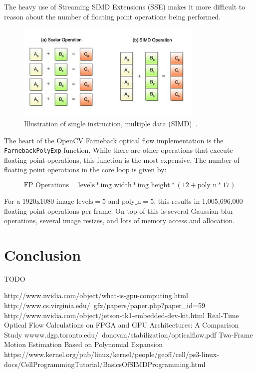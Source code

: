 \documentclass[12pt,letterpaper]{article}
\begin{document}
The heavy use of Streaming SIMD Extensions (SSE) makes it more difficult to
reason about the number of floating point operations being performed.

\begin{figure}[h]
  \centering
    \includegraphics[width=0.8\textwidth]{simd.jpg}
    \caption{Illustration of single instruction, multiple data
      (SIMD)~\cite{simd}.}
\end{figure}

The heart of the OpenCV Farneback optical flow implementation is the
\texttt{FarnebackPolyExp} function. While there are other operations that
execute floating point operations, this function is the most expensive. The
number of floating point operations in the core loop is given by:

$$
\text{FP Operations} = \text{levels} * \text{img\_width} * \text{img\_height}
                * (12 + \text{poly\_n} * 17)
$$

For a 1920x1080 image $\text{levels}=5$ and $\text{poly\_n}=5$, this results in
1,005,696,000 floating point operations per frame. On top of this is several
Gaussian blur operations, several image resizes, and lots of memory access and
allocation.

\section{Conclusion}
TODO

\begin{thebibliography}{10}
    http://www.nvidia.com/object/what-is-gpu-computing.html
    http://www.cs.virginia.edu/~gfx/papers/paper.php?paper\_id=59
    http://www.nvidia.com/object/jetson-tk1-embedded-dev-kit.html
    Real-Time Optical Flow Calculations on FPGA and GPU Architectures: A Comparison
    Study
    wwww.dgp.toronto.edu/~donovan/stabilization/opticalflow.pdf
    Two-Frame Motion Estimation Based on Polynomial Expansion
    https://www.kernel.org/pub/linux/kernel/people/geoff/cell/ps3-linux-docs/CellProgrammingTutorial/BasicsOfSIMDProgramming.html
\end{thebibliography}
\end{document}
